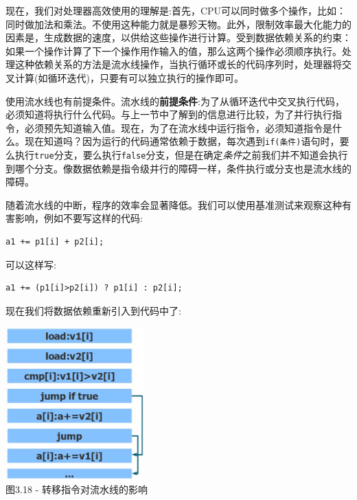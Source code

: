 现在，我们对处理器高效使用的理解是:首先，CPU可以同时做多个操作，比如：同时做加法和乘法。不使用这种能力就是暴殄天物。此外，限制效率最大化能力的因素是，生成数据的速度，以供给这些操作进行计算。受到数据依赖关系的约束：如果一个操作计算了下一个操作用作输入的值，那么这两个操作必须顺序执行。处理这种依赖关系的方法是流水线操作，当执行循环或长的代码序列时，处理器将交叉计算(如循环迭代)，只要有可以独立执行的操作即可。

使用流水线也有前提条件。流水线的\textbf{前提条件}:为了从循环迭代中交叉执行代码，必须知道将执行什么代码。与上一节中了解到的信息进行比较，为了并行执行指令，必须预先知道输入值。现在，为了在流水线中运行指令，必须知道指令是什么。现在知道吗？因为运行的代码通常依赖于数据，每次遇到\texttt{if(条件)}语句时，要么执行\texttt{true}分支，要么执行\texttt{false}分支，但是在确定\textit{条件}之前我们并不知道会执行到哪个分支。像数据依赖是指令级并行的障碍一样，条件执行或分支也是流水线的障碍。

随着流水线的中断，程序的效率会显著降低。我们可以使用基准测试来观察这种有害影响，例如不要写这样的代码:

\begin{lstlisting}[style=styleCXX]
a1 += p1[i] + p2[i];
\end{lstlisting}

可以这样写:

\begin{lstlisting}[style=styleCXX]
a1 += (p1[i]>p2[i]) ? p1[i] : p2[i];
\end{lstlisting}

现在我们将数据依赖重新引入到代码中了:

\begin{center}
\includegraphics[width=0.4\textwidth]{content/1/chapter3/images/18.jpg}\\
图3.18 - 转移指令对流水线的影响
\end{center}

